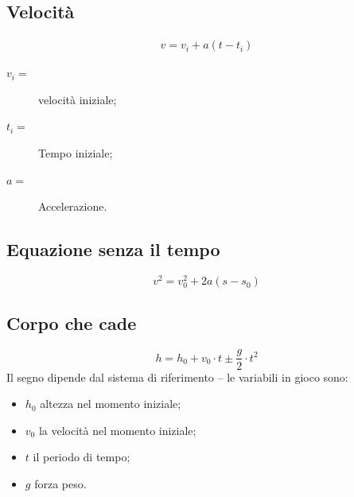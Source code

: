 \documentclass{book}
\begin{document}
\subsection{Velocità}
\label{sec:velmotouniformacc}
\begin{eqnarray}
  \label{eq:velmotouniformacc}
  v=v_i+a(t-t_i)
\end{eqnarray}

\begin{description}
\item[$v_i=$] velocità iniziale;
\item[$t_i=$] Tempo iniziale;
\item[$a=$] Accelerazione.
\end{description}

\subsection{Equazione senza il tempo}
\label{sec:eqsenzailtempo}

\begin{equation}
  \label{eq:eqsenzailtempo}
  v^2=v_0^2+2a(s-s_0)
\end{equation}
\subsection{Corpo che cade}
\label{sec:corpochecade}
\begin{equation}
  \label{eq:altezzadicaduta}
  h=h_0+v_0\cdot t \pm \frac{g}{2}\cdot t^2
\end{equation}
Il segno dipende dal sistema di riferimento -- le variabili in gioco sono:
\begin{itemize}
\item $h_0$ altezza nel momento iniziale;
\item $v_0$ la velocità nel momento iniziale;
\item $t$ il periodo di tempo;
\item $g$ forza peso.
\end{itemize}
\end{document}
